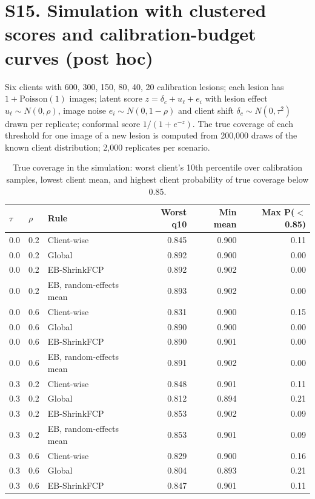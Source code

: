 \documentclass[10pt]{article}
\begin{document}
\section*{S15. Simulation with clustered scores and calibration-budget curves (post hoc)}
Six clients with 600, 300, 150, 80, 40, 20 calibration lesions; each lesion has $1+\mathrm{Poisson}(1)$ images; latent score $z=\delta_c+u_\ell+e_i$ with lesion effect $u_\ell\sim N(0,\rho)$, image noise $e_i\sim N(0,1-\rho)$ and client shift $\delta_c\sim N(0,\tau^2)$ drawn per replicate; conformal score $1/(1+e^{-z})$. The true coverage of each threshold for one image of a new lesion is computed from 200,000 draws of the known client distribution; 2,000 replicates per scenario.
\begin{table}[!htbp]
\centering
\scriptsize
\caption{True coverage in the simulation: worst client's 10th percentile over calibration samples, lowest client mean, and highest client probability of true coverage below 0.85.}
\label{tab:s16}
\begin{tabular}{@{}lllrrr@{}}
\toprule
$\tau$ & $\rho$ & Rule & Worst q10 & Min mean & Max P($<$0.85) \\
\midrule
0.0 & 0.2 & Client-wise & 0.845 & 0.900 & 0.11 \\
0.0 & 0.2 & Global & 0.892 & 0.900 & 0.00 \\
0.0 & 0.2 & EB-ShrinkFCP & 0.892 & 0.902 & 0.00 \\
0.0 & 0.2 & EB, random-effects mean & 0.893 & 0.902 & 0.00 \\
\midrule
0.0 & 0.6 & Client-wise & 0.831 & 0.900 & 0.15 \\
0.0 & 0.6 & Global & 0.890 & 0.900 & 0.00 \\
0.0 & 0.6 & EB-ShrinkFCP & 0.890 & 0.901 & 0.00 \\
0.0 & 0.6 & EB, random-effects mean & 0.891 & 0.902 & 0.00 \\
\midrule
0.3 & 0.2 & Client-wise & 0.848 & 0.901 & 0.11 \\
0.3 & 0.2 & Global & 0.812 & 0.894 & 0.21 \\
0.3 & 0.2 & EB-ShrinkFCP & 0.853 & 0.902 & 0.09 \\
0.3 & 0.2 & EB, random-effects mean & 0.853 & 0.901 & 0.09 \\
\midrule
0.3 & 0.6 & Client-wise & 0.829 & 0.900 & 0.16 \\
0.3 & 0.6 & Global & 0.804 & 0.893 & 0.21 \\
0.3 & 0.6 & EB-ShrinkFCP & 0.847 & 0.901 & 0.11 \\

\end{tabular}
\end{table}
\end{document}
